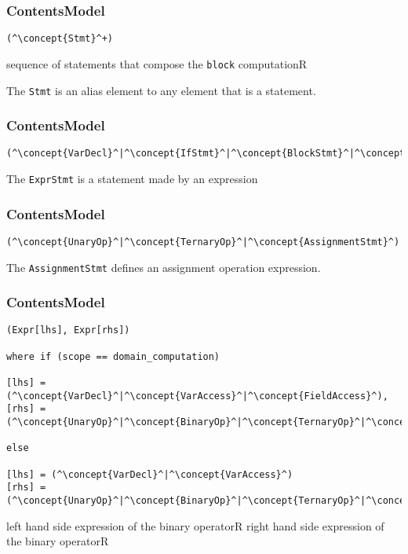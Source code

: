 \subsubsection*{ContentsModel}{}

\begin{lstlisting}[style=default]
(^\concept{Stmt}^+)
\end{lstlisting}

\begin{HIRChildElements}
	{sequence of statements that compose the {\tt block} computation}{R}
\end{HIRChildElements}

The {\tt Stmt} is an alias element to any element that is a statement.

\subsubsection*{ContentsModel}{}

\begin{lstlisting}[style=default]
(^\concept{VarDecl}^|^\concept{IfStmt}^|^\concept{BlockStmt}^|^\concept{IfStmt}^|^\concept{ExprStmt}^)
\end{lstlisting}

The {\tt ExprStmt} is a statement made by an expression

\subsubsection*{ContentsModel}{}

\begin{lstlisting}[style=default]
(^\concept{UnaryOp}^|^\concept{TernaryOp}^|^\concept{AssignmentStmt}^)
\end{lstlisting}



The {\tt AssignmentStmt} defines an assignment operation expression.

\subsubsection*{ContentsModel}{}

\begin{lstlisting}[style=default]
(Expr[lhs], Expr[rhs])

where if (scope == domain_computation)

[lhs] = (^\concept{VarDecl}^|^\concept{VarAccess}^|^\concept{FieldAccess}^),
[rhs] =	(^\concept{UnaryOp}^|^\concept{BinaryOp}^|^\concept{TernaryOp}^|^\concept{Literal}^|^\concept{FieldAccess}^)

else

[lhs] = (^\concept{VarDecl}^|^\concept{VarAccess}^)
[rhs] =	(^\concept{UnaryOp}^|^\concept{BinaryOp}^|^\concept{TernaryOp}^|^\concept{Literal}^)
\end{lstlisting}


\begin{HIRChildElements}
	\HIRElementDef{[lhs]}
	{left hand side expression of the binary operator}{R}
	\HIRElementDef{[rhs]}
	{right hand side expression of the binary operator}{R}
\end{HIRChildElements}
